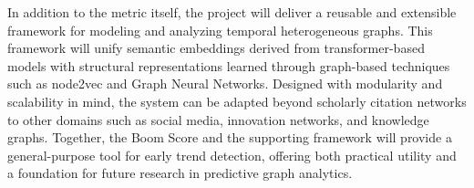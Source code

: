 \documentclass[a4paper,12pt]{article}
\begin{document}
In addition to the metric itself, the project will deliver a reusable and extensible 
framework for modeling and analyzing temporal heterogeneous graphs. This framework will 
unify semantic embeddings derived from transformer-based models with structural 
representations learned through graph-based techniques such as node2vec and Graph Neural 
Networks. Designed with modularity and scalability in mind, the system can be adapted 
beyond scholarly citation networks to other domains such as social media, innovation 
networks, and knowledge graphs. Together, the Boom Score and the supporting framework 
will provide a general-purpose tool for early trend detection, offering both practical 
utility and a foundation for future research in predictive graph analytics.

\newpage

\renewcommand{\refname}{\textit{References}} 
\printbibliography
\newpage

\newpage
\end{document}
